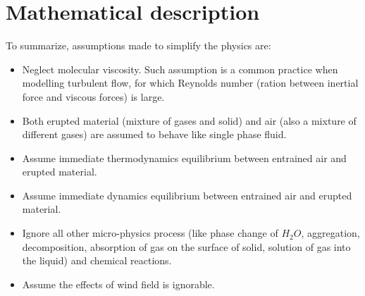 \section{Mathematical description}\label{sec:chp2-Mathematical-Description}

To summarize, assumptions made to simplify the physics are:
\begin{itemize}
\item Neglect molecular viscosity. Such assumption is a common practice when modelling turbulent flow, for which Reynolds number (ration between inertial force and viscous forces) is large.
\item Both erupted material (mixture of gases and solid) and air (also a mixture of different gases) are assumed to behave like single phase fluid.
\item Assume immediate thermodynamics equilibrium between entrained air and erupted material. 
\item Assume immediate dynamics equilibrium between entrained air and erupted material.
\item Ignore all other micro-physics process (like phase change of $H_2O$, aggregation, decomposition, absorption of gas on the surface of solid, solution of gas into the liquid) and chemical reactions.
\item Assume the effects of wind field is ignorable.
\end{itemize}

